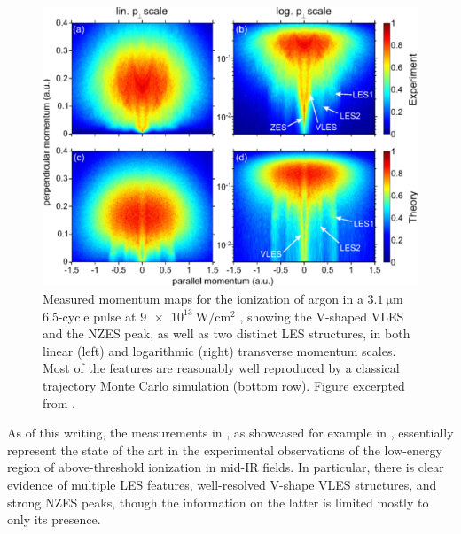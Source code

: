 \begin{figure}[h!t]
  \vspace{2mm}
  \centering
  \subfigure{\label{f6-wolter-original-figure-a}}
  \subfigure{\label{f6-wolter-original-figure-b}}
  \subfigure{\label{f6-wolter-original-figure-c}}
  \subfigure{\label{f6-wolter-original-figure-d}}
  \includegraphics[scale=0.7]{6-LES/Figures/figure6F.png}
  \caption[
  Measured and CTMC high-resolution photoelectron momentum maps showing LES, VLES and ZES structures, observed by Wolter et al.
  ]{
  Measured momentum maps for the ionization of argon in a $\SI{3.1}{\micro\meter}$ 6.5-cycle pulse at $\SI{9e13}{\watt/\centi\meter^2}$ \cite{ZES_paper}, showing the V-shaped VLES and the NZES peak, as well as two distinct LES structures, in both linear (left) and logarithmic (right) transverse momentum scales. Most of the features are reasonably well reproduced by a classical trajectory Monte Carlo simulation (bottom row).
  Figure excerpted from .
  }
\label{f6-wolter-original-figure}
\end{figure}






As of this writing, the measurements in , as showcased for example in , essentially represent the state of the art in the experimental observations of the low-energy region of above-threshold ionization in mid-IR fields. In particular, there is clear evidence of multiple LES features, well-resolved V-shape VLES structures, and strong NZES peaks, though the information on the latter is limited mostly to only its presence.





